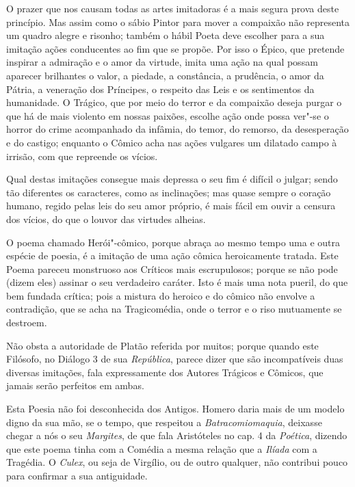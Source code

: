 O prazer que nos causam todas as artes imitadoras
é a mais segura prova deste princípio. Mas assim 
como o sábio Pintor para mover a compaixão não 						%
representa um quadro alegre e risonho; também o hábil 
Poeta deve escolher para a sua imitação ações 
conducentes ao fim que se propõe. Por isso o Épico, 					\index{\Epico}
que pretende inspirar a admiração e o amor da virtude, 
imita uma ação na qual possam aparecer brilhantes o valor,
a piedade, a constância, a prudência, o amor da Pátria, 
a veneração dos Príncipes, o respeito das Leis e os 
sentimentos da humanidade. O Trágico, que por meio do terror 				\index{\Trag}
e da compaixão deseja purgar o que há de mais violento em  
nossas paixões, escolhe ação onde possa ver"-se o horror 
do crime acompanhado da infâmia, do temor, do remorso, da desesperação 
e do castigo; enquanto o Cômico acha nas ações vulgares 				\index{\Comic}
um dilatado campo à irrisão, com que repreende os vícios.

Qual destas imitações consegue mais depressa o seu fim
é difícil o julgar; sendo tão diferentes os caracteres, 
como as inclinações; mas quase sempre o coração humano,
regido pelas leis do seu amor próprio, é mais fácil em ouvir 
a censura dos vícios, do que o louvor das virtudes alheias.

O poema chamado Herói"-cômico, porque abraça ao mesmo
tempo uma e outra espécie de poesia, é a imitação 
de uma ação cômica heroicamente tratada. 
Este Poema pareceu monstruoso aos Críticos mais escrupulosos; 
porque se não pode (dizem eles) assinar o seu verdadeiro caráter. 
Isto é mais uma nota pueril, do que bem fundada crítica; 
pois a mistura do heroico e do cômico não envolve a
contradição, que se acha na Tragicomédia, onde o terror 
e o riso mutuamente se destroem. 							\index{\Comic}\index{\Heroic}

Não obsta a autoridade de Platão referida por muitos; 					\index{\Plat}
porque quando este Filósofo, no Diálogo 3 de sua \textit{República}, 			\index{\Trag}
parece dizer que são incompatíveis duas diversas imitações, 
fala expressamente dos Autores Trágicos e Cômicos, que jamais
serão perfeitos em ambas. 								\index{\Comic} \index{\Plat} \index{\Repub} \index{\Trag}

Esta Poesia não foi desconhecida dos Antigos.  Homero daria				\index{\Homer}
mais de um modelo digno da sua mão, se o tempo, que
respeitou a \textit{Batracomiomaquia}, deixasse chegar a nós o seu			\index{\Batr}
\textit{Margites}, de que fala								\index{\Margi}
Aristóteles no cap. 4 da \textit{Poética}, dizendo que este poema tinha com a		\index{\Arist}
Comédia a mesma relação que a \textit{Ilíada} com a Tragédia. O
\textit{Culex}, ou seja de Virgílio, ou de outro qualquer, não contribui 
pouco para confirmar a sua antiguidade.							\index{\Culex} \index{\Margi} \index{\Poet} \index{\Trag} %

